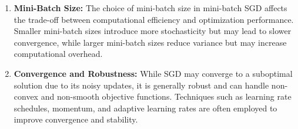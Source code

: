 \documentclass[12pt, a4paper]{article}
\begin{document}
\begin{itemize}
\begin{enumerate}
        \item \textbf{Mini-Batch Size:} \hfuzz=1.5pt The choice of mini-batch size in mini-batch SGD affects the trade-off between computational efficiency and optimization performance. Smaller mini-batch sizes introduce more stochasticity but may lead to slower convergence, while larger mini-batch sizes reduce variance but may increase computational overhead.
        \item \textbf{Convergence and Robustness:} While SGD may converge to a suboptimal solution due to its noisy updates, it is generally robust and can handle non-convex and non-smooth objective functions. Techniques such as learning rate schedules, momentum, and adaptive learning rates are often employed to improve convergence and stability.
    \end{enumerate}
\end{itemize}
\end{document}
